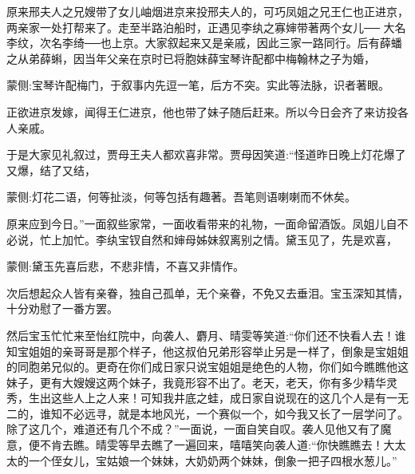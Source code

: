 \begin{parag}
    原来邢夫人之兄嫂带了女儿岫烟进京来投邢夫人的，可巧凤姐之兄王仁也正进京，两亲家一处打帮来了。走至半路泊船时，正遇见李纨之寡婶带著两个女儿── 大名李纹，次名李绮──也上京。大家叙起来又是亲戚，因此三家一路同行。后有薛蟠之从弟薛蝌，因当年父亲在京时已将胞妹薛宝琴许配都中梅翰林之子为婚，\begin{note}蒙侧:宝琴许配梅门，于叙事内先逗一笔，后方不突。实此等法脉，识者著眼。\end{note}正欲进京发嫁，闻得王仁进京，他也带了妹子随后赶来。所以今日会齐了来访投各人亲戚。
\end{parag}


\begin{parag}
    于是大家见礼叙过，贾母王夫人都欢喜非常。贾母因笑道:“怪道昨日晚上灯花爆了又爆，结了又结，\begin{note}蒙侧:灯花二语，何等扯淡，何等包括有趣著。吾笔则语喇喇而不休矣。\end{note}原来应到今日。”一面叙些家常，一面收看带来的礼物，一面命留酒饭。凤姐儿自不必说，忙上加忙。李纨宝钗自然和婶母姊妹叙离别之情。黛玉见了，先是欢喜，\begin{note}蒙侧:黛玉先喜后悲，不悲非情，不喜又非情作。\end{note}次后想起众人皆有亲眷，独自己孤单，无个亲眷，不免又去垂泪。宝玉深知其情，十分劝慰了一番方罢。
\end{parag}


\begin{parag}
    然后宝玉忙忙来至怡红院中，向袭人、麝月、晴雯等笑道:“你们还不快看人去！谁知宝姐姐的亲哥哥是那个样子，他这叔伯兄弟形容举止另是一样了，倒象是宝姐姐的同胞弟兄似的。更奇在你们成日家只说宝姐姐是绝色的人物，你们如今瞧瞧他这妹子，更有大嫂嫂这两个妹子，我竟形容不出了。老天，老天，你有多少精华灵秀，生出这些人上之人来！可知我井底之蛙，成日家自说现在的这几个人是有一无二的，谁知不必远寻，就是本地风光，一个赛似一个，如今我又长了一层学问了。除了这几个，难道还有几个不成？”一面说，一面自笑自叹。袭人见他又有了魔意，便不肯去瞧。晴雯等早去瞧了一遍回来，嘻嘻笑向袭人道:“你快瞧瞧去！大太太的一个侄女儿，宝姑娘一个妹妹，大奶奶两个妹妹，倒象一把子四根水葱儿。”
\end{parag}


